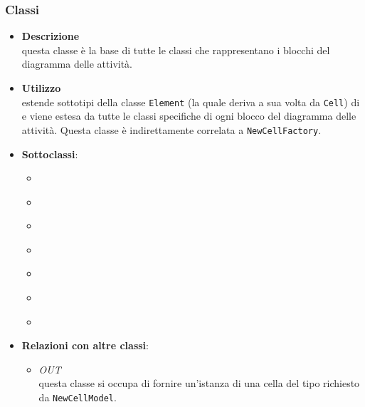 \subsubsection{Classi}
\label{\nogloxy{swedesigner::client::model::celltypes::activity::ActivityDiagramElement}}
\begin{itemize}
\item \textbf{Descrizione}\\
questa classe è la base di tutte le classi che rappresentano i blocchi del diagramma delle attività.
\item \textbf{Utilizzo}\\
estende sottotipi della classe \texttt{Element} (la quale deriva a sua volta da \texttt{Cell})  di \jointjs{} e viene estesa da tutte le classi specifiche di ogni blocco del diagramma delle attività. Questa classe è indirettamente correlata a \texttt{NewCellFactory}.
\item \textbf{Sottoclassi}:
\begin{itemize}
\item \hyperref[\nogloxy{swedesigner::client::model::celltypes::activity::HxCustom}]{}
\item \hyperref[\nogloxy{swedesigner::client::model::celltypes::activity::HxElse}]{}
\item \hyperref[\nogloxy{swedesigner::client::model::celltypes::activity::HxFor}]{}
\item \hyperref[\nogloxy{swedesigner::client::model::celltypes::activity::HxIf}]{}
\item \hyperref[\nogloxy{swedesigner::client::model::celltypes::activity::HxReturn}]{}
\item \hyperref[\nogloxy{swedesigner::client::model::celltypes::activity::HxVariable}]{}
\item \hyperref[\nogloxy{swedesigner::client::model::celltypes::activity::HxWhile}]{}
\end{itemize}
\item \textbf{Relazioni con altre classi}:
\begin{itemize}
\item \textit{OUT} \hyperref[\nogloxy{swedesigner::client::model::NewCellFactory}]{}\\
questa classe si occupa di fornire un'istanza di una cella del tipo richiesto da \texttt{NewCellModel}. 
\end{itemize}
\end{itemize}


